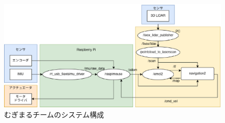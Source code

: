 \begin{figure}[h]
  \begin{center}
    \includegraphics[width=1.0\linewidth]{figs/mugimaru_system_2024.eps}
    \caption{むぎまるチームのシステム構成}
    \label{fig:mugimaru_system}
  \end{center}
\end{figure}

